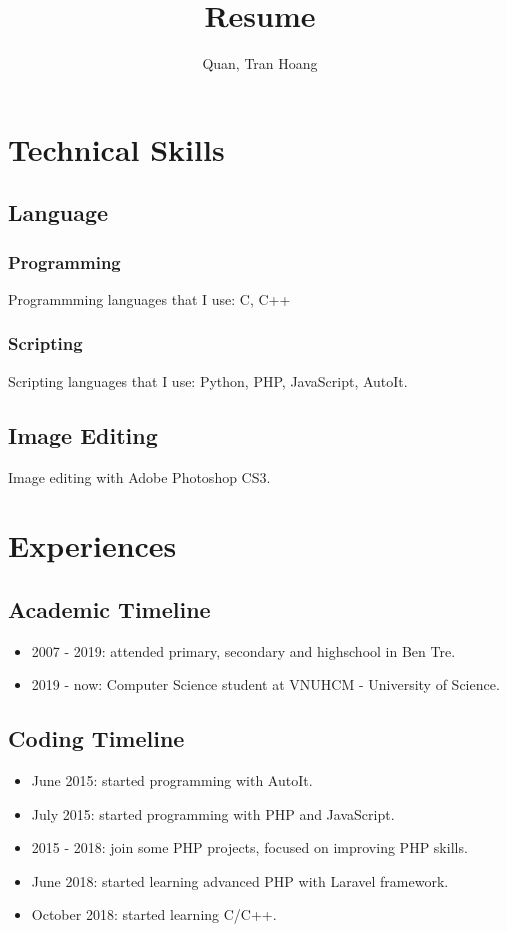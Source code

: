 \documentclass{article}
\begin{document}
	\title{Resume}
	\author{Quan, Tran Hoang}
	\maketitle
	
	\section{Technical Skills}
	
	\subsection{Language}
		\subsubsection{Programming}
			Programmming languages that I use: C, C++
		\subsubsection{Scripting}
			Scripting languages that I use: Python, PHP, JavaScript, AutoIt.
	
	\subsection{Image Editing}
	Image editing with Adobe Photoshop CS3.
	
	\section{Experiences}
		\subsection{Academic Timeline}
			\begin{itemize}
				\item 2007 - 2019: attended primary, secondary and highschool in Ben Tre.
				\item 2019 - now: Computer Science student at VNUHCM - University of Science.
			\end{itemize}

		\subsection{Coding Timeline}
			\begin{itemize}
				\item June 2015: started programming with AutoIt.
				\item July 2015: started programming with PHP and JavaScript.
				\item 2015 - 2018: join some PHP projects, focused on improving PHP skills.
				\item June 2018: started learning advanced PHP with Laravel framework.
				\item October 2018: started learning C/C++.
			\end{itemize}
		
\end{document}

